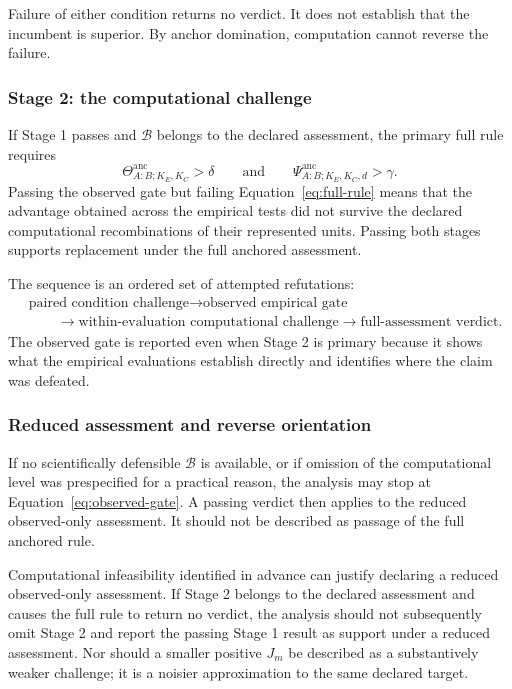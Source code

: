 \documentclass[11pt]{article}
\newcommand{\Boot}{\mathcal{B}}
\newcommand{\Psianc}{\Psi^{\mathrm{anc}}}
\newcommand{\Thetaanc}{\Theta^{\mathrm{anc}}}
\theoremstyle{remark}
\begin{document}
Failure of either condition returns no verdict. It does not establish that the
incumbent is superior. By anchor domination, computation cannot reverse the
failure.

\subsubsection{Stage 2: the computational challenge}

If Stage 1 passes and $\Boot$ belongs to the declared assessment, the primary
full rule requires
\begin{equation}
\Thetaanc_{A:B;K_E,K_C}>\delta
\qquad\text{and}\qquad
\Psianc_{A:B;K_E,K_C,d}>\gamma.
\label{eq:full-rule}
\end{equation}
Passing the observed gate but failing Equation~\eqref{eq:full-rule} means that
the advantage obtained across the empirical tests did not survive the declared
computational recombinations of their represented units. Passing both stages
supports replacement under the full anchored assessment.

The sequence is an ordered set of attempted refutations:
\[
\begin{aligned}
&\text{paired condition challenge}
\longrightarrow
\text{observed empirical gate}\\
&\qquad\longrightarrow
\text{within-evaluation computational challenge}
\longrightarrow
\text{full-assessment verdict}.
\end{aligned}
\]
The observed gate is reported even when Stage 2 is primary because it shows
what the empirical evaluations establish directly and identifies where the
claim was defeated.

\subsubsection{Reduced assessment and reverse orientation}

If no scientifically defensible $\Boot$ is available, or if omission of the
computational level was prespecified for a practical reason, the analysis may
stop at Equation~\eqref{eq:observed-gate}. A passing verdict then applies to
the reduced observed-only assessment. It should not be described as passage of
the full anchored rule.

Computational infeasibility identified in advance can justify declaring a
reduced observed-only assessment. If Stage 2 belongs to the declared
assessment and causes the full rule to return no verdict, the analysis should
not subsequently omit Stage 2 and report the passing Stage 1 result as support
under a reduced assessment. Nor should a smaller positive $J_m$ be described
as a substantively weaker challenge; it is a noisier approximation to the same
declared target.
\end{document}
